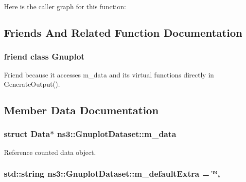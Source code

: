 Here is the caller graph for this function\+:




\subsection{Friends And Related Function Documentation}
\subsubsection[{\texorpdfstring{Gnuplot}{Gnuplot}}]{\setlength{\rightskip}{0pt plus 5cm}friend class {\bf Gnuplot}\hspace{0.3cm}{\ttfamily [friend]}}\hypertarget{classns3_1_1GnuplotDataset_a1c5849e8b50d57cb5e3c7a2557e875e9}{}\label{classns3_1_1GnuplotDataset_a1c5849e8b50d57cb5e3c7a2557e875e9}
Friend because it accesses m\+\_\+data and it\textquotesingle{}s virtual functions directly in Generate\+Output(). 

\subsection{Member Data Documentation}
\subsubsection[{\texorpdfstring{m\+\_\+data}{m_data}}]{\setlength{\rightskip}{0pt plus 5cm}struct {\bf Data}$\ast$ ns3\+::\+Gnuplot\+Dataset\+::m\+\_\+data\hspace{0.3cm}{\ttfamily [protected]}}\hypertarget{classns3_1_1GnuplotDataset_a5ac51c2f9860283061e00cb046c56317}{}\label{classns3_1_1GnuplotDataset_a5ac51c2f9860283061e00cb046c56317}
Reference counted data object. 
\subsubsection[{\texorpdfstring{m\+\_\+default\+Extra}{m_defaultExtra}}]{\setlength{\rightskip}{0pt plus 5cm}std\+::string ns3\+::\+Gnuplot\+Dataset\+::m\+\_\+default\+Extra = \char`\"{}\char`\"{}\hspace{0.3cm}{\ttfamily [static]}, {\ttfamily [protected]}}\hypertarget{classns3_1_1GnuplotDataset_a6b75e4f59f53c4d58a7679759a830e3e}{}\label{classns3_1_1GnuplotDataset_a6b75e4f59f53c4d58a7679759a830e3e}


